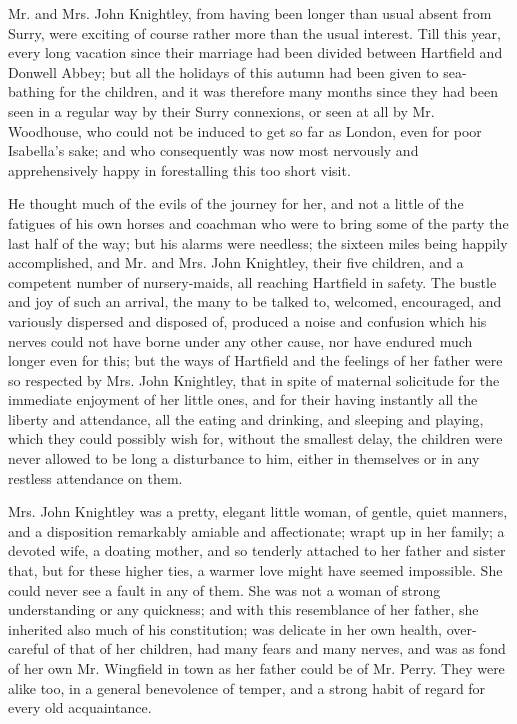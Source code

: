 Mr. and Mrs. John Knightley, from having been longer than usual absent from Surry, were exciting of course rather more than the usual interest. Till this year, every long vacation since their marriage had been divided between Hartfield and Donwell Abbey; but all the holidays of this autumn had been given to sea-bathing for the children, and it was therefore many months since they had been seen in a regular way by their Surry connexions, or seen at all by Mr. Woodhouse, who could not be induced to get so far as London, even for poor Isabella's sake; and who consequently was now most nervously and apprehensively happy in forestalling this too short visit.

He thought much of the evils of the journey for her, and not a little of the fatigues of his own horses and coachman who were to bring some of the party the last half of the way; but his alarms were needless; the sixteen miles being happily accomplished, and Mr. and Mrs. John Knightley, their five children, and a competent number of nursery-maids, all reaching Hartfield in safety. The bustle and joy of such an arrival, the many to be talked to, welcomed, encouraged, and variously dispersed and disposed of, produced a noise and confusion which his nerves could not have borne under any other cause, nor have endured much longer even for this; but the ways of Hartfield and the feelings of her father were so respected by Mrs. John Knightley, that in spite of maternal solicitude for the immediate enjoyment of her little ones, and for their having instantly all the liberty and attendance, all the eating and drinking, and sleeping and playing, which they could possibly wish for, without the smallest delay, the children were never allowed to be long a disturbance to him, either in themselves or in any restless attendance on them.

Mrs. John Knightley was a pretty, elegant little woman, of gentle, quiet manners, and a disposition remarkably amiable and affectionate; wrapt up in her family; a devoted wife, a doating mother, and so tenderly attached to her father and sister that, but for these higher ties, a warmer love might have seemed impossible. She could never see a fault in any of them. She was not a woman of strong understanding or any quickness; and with this resemblance of her father, she inherited also much of his constitution; was delicate in her own health, over-careful of that of her children, had many fears and many nerves, and was as fond of her own Mr. Wingfield in town as her father could be of Mr. Perry. They were alike too, in a general benevolence of temper, and a strong habit of regard for every old acquaintance.

